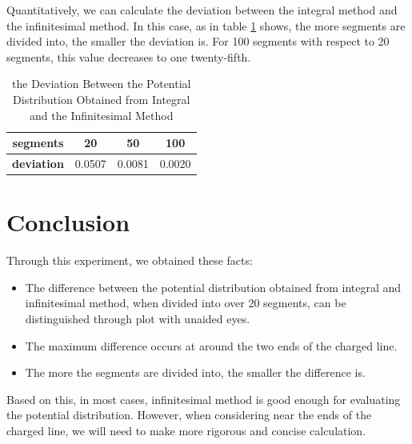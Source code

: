 \documentclass[journal]{IEEEtran}
\begin{document}
Quantitatively, we can calculate the deviation between the integral method and the infinitesimal method. In this case, as in table \ref{tab:deviation} shows, the more segments are divided into, the smaller the deviation is. For 100 segments with respect to 20 segments, this value decreases to one twenty-fifth.

\begin{table}[h]
    \renewcommand{\arraystretch}{1.3}
    \caption{the Deviation Between the Potential Distribution Obtained from Integral and the Infinitesimal Method}
    \label{tab:deviation}
    \centering
    \begin{tabular}{c|ccc}
        \toprule
        \textbf{segments}  & 20     & 50     & 100    \\
        \hline
        \textbf{deviation} & 0.0507 & 0.0081 & 0.0020 \\
        \bottomrule
    \end{tabular}
\end{table}

\section{Conclusion}

Through this experiment, we obtained these facts:

\begin{itemize}
    \item The difference between the potential distribution obtained from integral and infinitesimal method, when divided into over 20 segments, can be distinguished through plot with unaided eyes.
    \item The maximum difference occurs at around the two ends of the charged line.
    \item The more the segments are divided into, the smaller the difference is.
\end{itemize}

Based on this, in most cases, infinitesimal method is good enough for evaluating the potential distribution. However, when considering near the ends of the charged line, we will need to make more rigorous and concise calculation.


\ifCLASSOPTIONcaptionsoff
    \newpage
\fi


\end{document}
